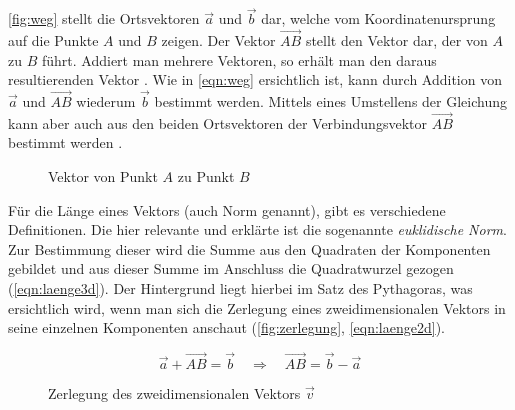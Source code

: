 \autoref{fig:weg} stellt die Ortsvektoren $\overrightarrow{a}$ und $\overrightarrow{b}$ dar, welche vom Koordinatenursprung auf die Punkte $A$ und $B$ zeigen.
Der Vektor $\overrightarrow{AB}$ stellt den Vektor dar, der von $A$ zu $B$ führt.
Addiert man mehrere Vektoren, so erhält man den daraus resultierenden Vektor \cite[11]{kohn2012}.
Wie in \autoref{eqn:weg} ersichtlich ist, kann durch Addition von $\overrightarrow{a}$ und $\overrightarrow{AB}$ wiederum $\overrightarrow{b}$ bestimmt werden.
Mittels eines Umstellens der Gleichung kann aber auch aus den beiden Ortsvektoren der Verbindungsvektor $\overrightarrow{AB}$ bestimmt werden \cite[12]{kohn2012}.

\begin{figure}
    \centering
    \caption{Vektor von Punkt $A$ zu Punkt $B$}
    \label{fig:weg}
\end{figure}

Für die Länge eines Vektors (auch Norm genannt), gibt es verschiedene Definitionen.
Die hier relevante und erklärte ist die sogenannte \emph{euklidische Norm}.
Zur Bestimmung dieser wird die Summe aus den Quadraten der Komponenten gebildet und aus dieser Summe im Anschluss die Quadratwurzel gezogen \cite[30]{kohn2012} (\autoref{eqn:laenge3d}).
Der Hintergrund liegt hierbei im Satz des Pythagoras, was ersichtlich wird, wenn man sich die Zerlegung eines zweidimensionalen Vektors in seine einzelnen Komponenten anschaut (\autoref{fig:zerlegung}, \autoref{eqn:laenge2d}).


\begin{equation}
    \label{eqn:weg}
    \overrightarrow{a} + \overrightarrow{AB} = \overrightarrow{b}
    \quad \Rightarrow \quad
    \overrightarrow{AB} = \overrightarrow{b} - \overrightarrow{a}
\end{equation}

\begin{figure}
    \centering
    \caption{Zerlegung des zweidimensionalen Vektors $\overrightarrow{v}$}
    \label{fig:zerlegung}
\end{figure}


